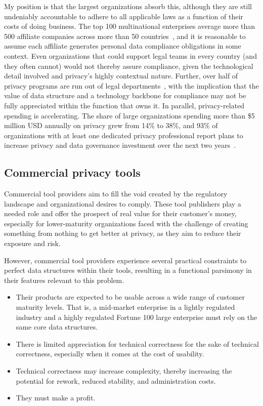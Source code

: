 \documentclass[10pt,letterpaper,twocolumn,twoside]{rho-class/rho}
\begin{document}
My position is that the largest organizations absorb this, although they are still undeniably accountable to adhere to all applicable laws as a function of their costs of doing business. The top 100 multinational enterprises average more than 500 affiliate companies across more than 50 countries~\cite{unctad-top100}, and it is reasonable to assume each affiliate generates personal data compliance obligations in some context. Even organizations that could support legal teams in every country (and they often cannot) would not thereby assure compliance, given the technological detail involved and privacy's highly contextual nature. Further, over half of privacy programs are run out of legal departments~\cite{IAPP2024Gov}, with the implication that the value of data structure and a technology backbone for compliance may not be fully appreciated within the function that owns it. In parallel, privacy-related spending is accelerating. The share of large organizations spending more than \$5 million USD annually on privacy grew from 14\% to 38\%, and 93\% of organizations with at least one dedicated privacy professional report plans to increase privacy and data governance investment over the next two years~\cite{IAPP2024Gov}.

\subsection{Commercial privacy tools}\label{sec:comtools}

Commercial tool providers aim to fill the void created by the regulatory landscape and organizational desires to comply. These tool publishers play a needed role and offer the prospect of real value for their customer's money, especially for lower-maturity organizations faced with the challenge of creating something from nothing to get better at privacy, as they aim to reduce their exposure and risk.

However, commercial tool providers experience several practical constraints to perfect data structures within their tools, resulting in a functional parsimony in their features relevant to this problem.
\begin{itemize}
    \item Their products are expected to be usable across a wide range of customer maturity levels. That is, a mid-market enterprise in a lightly regulated industry and a highly regulated Fortune 100 large enterprise must rely on the same core data structures.
    \item There is limited appreciation for technical correctness for the sake of technical correctness, especially when it comes at the cost of usability.
    \item Technical correctness may increase complexity, thereby increasing the potential for rework, reduced stability, and administration costs.
    \item They must make a profit.
    
\end{itemize}
\end{document}
